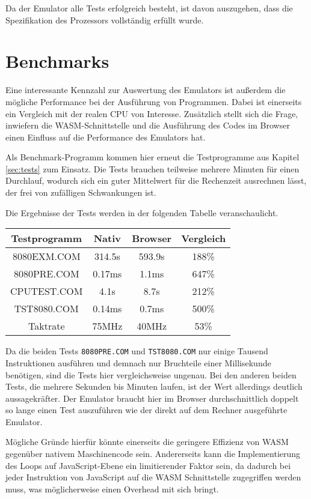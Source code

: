 Da der Emulator alle Tests erfolgreich besteht, ist davon auszugehen, dass die Spezifikation des Prozessors vollständig erfüllt wurde.

\section{Benchmarks}

Eine interessante Kennzahl zur Auswertung des Emulators ist außerdem die mögliche Performance bei der Ausführung von Programmen. Dabei ist einerseits ein Vergleich mit der realen \ac{CPU} von Interesse. Zusätzlich stellt sich die Frage, inwiefern die \ac{WASM}-Schnittstelle und die Ausführung des Codes im Browser einen Einfluss auf die Performance des Emulators hat.

Als Benchmark-Programm kommen hier erneut die Testprogramme aus Kapitel \ref{sec:tests} zum Einsatz. Die Tests brauchen teilweise mehrere Minuten für einen Durchlauf, wodurch sich ein guter Mittelwert für die Rechenzeit ausrechnen lässt, der frei von zufälligen Schwankungen ist.

Die Ergebnisse der Tests werden in der folgenden Tabelle veranschaulicht.

\begin{center}
\begin{tabular}{ |c|c|c|c| } 
    \hline
    Testprogramm & Nativ & Browser & Vergleich \\
    \hline
    8080EXM.COM & 314.5s & 593.9s & 188\% \\
    8080PRE.COM & 0.17ms & 1.1ms & 647\% \\
    CPUTEST.COM & 4.1s & 8.7s & 212\% \\
    TST8080.COM & 0.14ms & 0.7ms & 500\% \\
    \hline
    Taktrate & 75MHz & 40MHz & 53\% \\
    \hline
\end{tabular}
\end{center}

Da die beiden Tests \texttt{8080PRE.COM} und \texttt{TST8080.COM} nur einige Tausend Instruktionen ausführen und demnach nur Bruchteile einer Millisekunde benötigen, sind die Tests hier vergleichsweise ungenau. Bei den anderen beiden Tests, die mehrere Sekunden bis Minuten laufen, ist der Wert allerdings deutlich aussagekräfter. Der Emulator braucht hier im Browser durchschnittlich doppelt so lange einen Test auszuführen wie der direkt auf dem Rechner ausgeführte Emulator.

Mögliche Gründe hierfür könnte einerseits die geringere Effizienz von \ac{WASM} gegenüber nativem Maschinencode sein. Andererseits kann die Implementierung des Loops auf JavaScript-Ebene ein limitierender Faktor sein, da dadurch bei jeder Instruktion von JavaScript auf die \ac{WASM} Schnittstelle zugegriffen werden muss, was möglicherweise einen Overhead mit sich bringt.

